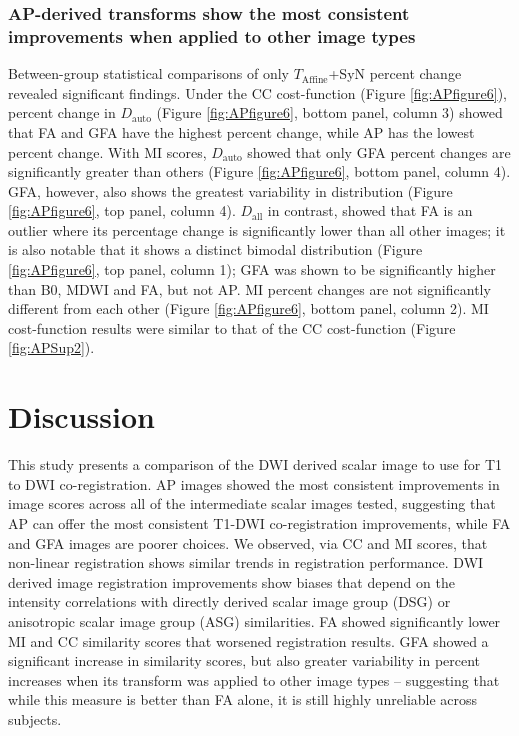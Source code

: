 \subsubsection{AP-derived transforms show the most consistent improvements when applied to other image types}

Between-group statistical comparisons of only $T_{\text{Affine}}$+SyN percent change revealed significant findings. Under the CC cost-function (Figure \ref{fig:APfigure6}), percent change in $D_{\text{auto}}$ (Figure \ref{fig:APfigure6}, bottom panel, column 3) showed that FA and GFA have the highest percent change, while AP has the lowest percent change. With MI scores, $D_{\text{auto}}$ showed that only GFA percent changes are significantly greater than others (Figure \ref{fig:APfigure6}, bottom panel, column 4). GFA, however, also shows the greatest variability in distribution (Figure \ref{fig:APfigure6}, top panel, column 4).  $D_{\text{all}}$ in contrast, showed that FA is an outlier where its percentage change is significantly lower than all other images; it is also notable that it shows a distinct bimodal distribution (Figure \ref{fig:APfigure6}, top panel, column 1); GFA was shown to be significantly higher than B0, MDWI and FA, but not AP. MI percent changes are not significantly different from each other (Figure \ref{fig:APfigure6}, bottom panel, column 2). MI cost-function results were similar to that of the CC cost-function (Figure \ref{fig:APSup2}). 

\section{Discussion}

This study presents a comparison of the DWI derived scalar image to use for T1 to DWI co-registration. AP images showed the most consistent improvements in image scores across all of the intermediate scalar images tested, suggesting that AP can offer the most consistent T1-DWI co-registration improvements, while FA and GFA images are poorer choices. We observed, via CC and MI scores, that non-linear registration shows similar trends in registration performance. DWI derived image registration improvements show biases that depend on the intensity correlations with directly derived scalar image group (DSG) or anisotropic scalar image group (ASG) similarities. FA showed significantly lower MI and CC similarity scores that worsened registration results. GFA showed a significant increase in similarity scores, but also greater variability in percent increases when its transform was applied to other image types – suggesting that while this measure is better than FA alone, it is still highly unreliable across subjects. 

